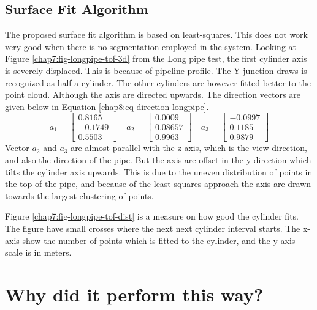 \subsection{Surface Fit Algorithm}
The proposed surface fit algorithm is based on least-squares. This does not work very good
when there is no segmentation employed in the system. Looking at Figure
\ref{chap7:fig-longpipe-tof-3d} from the Long pipe test, the first cylinder axis is severely displaced. This
is because of pipeline profile. The Y-junction draws is recognized as half a cylinder. The
other cylinders are however fitted better to the point cloud. Although the axis are
directed upwards. The direction vectors are given below in Equation
\eqref{chap8:eq-direction-longpipe}. 
\begin{equation}
    \label{chap8:eq-direction-longpipe}
    a_1 = \left[ \begin{matrix}
                        0.8165\\
                       -0.1749\\
                       0.5503 
                 \end{matrix} \right] \quad a_2 = \left [
                 \begin{matrix}
                       0.0009\\
                       0.08657\\
                       0.9963
                 \end{matrix} \right] \quad a_3 = \left [
                 \begin{matrix}
                       -0.0997\\
                       0.1185\\
                       0.9879
                 \end{matrix} \right]
\end{equation}
Vector $a_2$ and $a_3$ are almost parallel with the z-axis, which is the view direction,
and also the direction of the pipe. But the axis are offset in the y-direction which tilts
the cylinder axis upwards. This is due to the uneven distribution of points in the top of
the pipe, and because of the least-squares approach the axis are drawn towards the largest
clustering of points. 

Figure \ref{chap7:fig-longpipe-tof-dist} is a measure on how good the cylinder fits. The
figure have small crosses where the next next cylinder interval starts. The x-axis show
the number of points which is fitted to the cylinder, and the y-axis scale is in meters.




\section{Why did it perform this way?}



